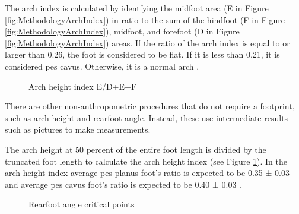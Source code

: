 The arch index is calculated by identfying the midfoot area (E in Figure \ref{fig:MethodologyArchIndex}) in ratio to the sum of the hindfoot (F in Figure \ref{fig:MethodologyArchIndex}), midfoot, and forefoot (D in Figure \ref{fig:MethodologyArchIndex}) areas. If the ratio of the arch index is equal to or larger than 0.26, the foot is considered to be flat. If it is less than 0.21, it is considered pes cavus. Otherwise, it is a normal arch \cite{igbigbi2005arch}. 

\begin{figure}[htbp]
\centering
{}
\caption{Arch height index E/D+E+F \cite{miller2014effect}}
\label{fig:MethodologyArchHeightIndex}
\end{figure}

There are other non-anthropometric procedures that do not require a footprint, such as arch height and rearfoot angle. Instead, these use intermediate results such as pictures to make measurements.

The arch height at 50 percent of the entire foot length is divided by the truncated foot length to calculate the arch height index (see Figure \ref{fig:MethodologyArchHeightIndex}). In the arch height index average pes planus foot’s ratio is expected to be 0.35 ± 0.03 and average pes cavus foot’s ratio is expected to be 0.40 ± 0.03 \cite{hillstrom2013foot}.

\begin{figure}[htbp]
\centering
{}
\caption{Rearfoot angle critical points \cite{langley2016clinical}}
\label{fig:MethodologyRearfootAngle}
\end{figure}

